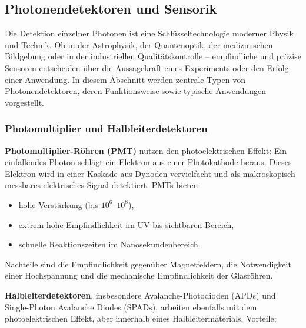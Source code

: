 \subsection{Photonendetektoren und Sensorik}

Die Detektion einzelner Photonen ist eine Schlüsseltechnologie moderner Physik und Technik. Ob in der Astrophysik, der Quantenoptik, der medizinischen Bildgebung oder in der industriellen Qualitätskontrolle – empfindliche und präzise Sensoren entscheiden über die Aussagekraft eines Experiments oder den Erfolg einer Anwendung. In diesem Abschnitt werden zentrale Typen von Photonendetektoren, deren Funktionsweise sowie typische Anwendungen vorgestellt.

\subsubsection{Photomultiplier und Halbleiterdetektoren}

\textbf{Photomultiplier-Röhren (PMT)} nutzen den photoelektrischen Effekt: Ein einfallendes Photon schlägt ein Elektron aus einer Photokathode heraus. Dieses Elektron wird in einer Kaskade aus Dynoden vervielfacht und als makroskopisch messbares elektrisches Signal detektiert. PMTs bieten:

\begin{itemize}
	\item hohe Verstärkung (bis $10^6$–$10^8$),
	\item extrem hohe Empfindlichkeit im UV bis sichtbaren Bereich,
	\item schnelle Reaktionszeiten im Nanosekundenbereich.
\end{itemize}

Nachteile sind die Empfindlichkeit gegenüber Magnetfeldern, die Notwendigkeit einer Hochspannung und die mechanische Empfindlichkeit der Glasröhren.

\medskip

\textbf{Halbleiterdetektoren}, insbesondere Avalanche-Photodioden (APDs) und Single-Photon Avalanche Diodes (SPADs), arbeiten ebenfalls mit dem photoelektrischen Effekt, aber innerhalb eines Halbleitermaterials. Vorteile:

